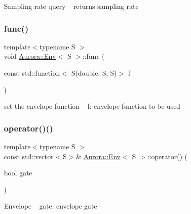 Sampling rate query ~\newline
returns sampling rate \mbox{\label{class_aurora_1_1_env_a0339b4b6d9eab42cbd9e6fd73b34fba7}} 
\subsubsection{\texorpdfstring{func()}{func()}}
{\footnotesize\ttfamily template$<$typename S $>$ \\
void \hyperlink{class_aurora_1_1_env}{Aurora\+::\+Env}$<$ S $>$\+::func (\begin{DoxyParamCaption}\item[{const std\+::function$<$ S(double, S, S)$>$}]{f }\end{DoxyParamCaption})\hspace{0.3cm}{\ttfamily [inline]}}

set the envelope function ~\newline
f\+: envelope function to be used \mbox{\label{class_aurora_1_1_env_a44666f7414faf21c568d20655d5e2761}} 
\subsubsection{\texorpdfstring{operator()()}{operator()()}\hspace{0.1cm}{\footnotesize\ttfamily [1/3]}}
{\footnotesize\ttfamily template$<$typename S $>$ \\
const std\+::vector$<$S$>$\& \hyperlink{class_aurora_1_1_env}{Aurora\+::\+Env}$<$ S $>$\+::operator() (\begin{DoxyParamCaption}\item[{bool}]{gate }\end{DoxyParamCaption})\hspace{0.3cm}{\ttfamily [inline]}}

Envelope ~\newline
gate\+: envelope gate \mbox{\label{class_aurora_1_1_env_a2cf905d912ec6089b42922a92d4d7d5e}} 
